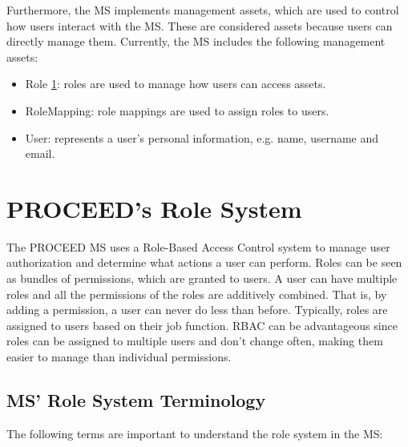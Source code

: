 Furthermore, the MS implements management assets, which are used to control how users interact with the MS.
These are considered assets because users can directly manage them.
Currently, the MS includes the following management assets:

\begin{itemize}
	\item Role \ref{cha:relatedwork:proceedroles}: roles are used to manage how users can access assets.
	\item{RoleMapping}: role mappings are used to assign roles to users.
	\item User: represents a user's personal information, e.g. name, username and email.
\end{itemize}


\section{PROCEED's Role System}
\label{cha:relatedwork:proceedroles}

The PROCEED MS uses a Role-Based Access Control %
system to manage user authorization and determine what actions a user can perform.
Roles can be seen as bundles of permissions, which are granted to users.
A user can have multiple roles and all the permissions of the roles are additively
combined. That is, by adding a permission, a user can never do less than before.
Typically, roles are assigned to users based on their job function.
RBAC can be advantageous since roles can be assigned to multiple users and
don't change often, making them easier to manage than individual permissions.

\subsection{MS' Role System Terminology}
\label{cha:relatedwork:proceedroles:terminology}

The following terms are important to understand the role system in the MS:

